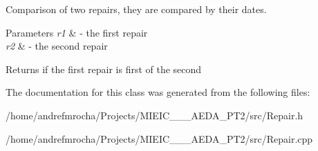 Comparison of two repairs, they are compared by their dates. 


\begin{DoxyParams}{Parameters}
{\em r1} & -\/ the first repair \\
\hline
{\em r2} & -\/ the second repair \\
\hline
\end{DoxyParams}
\begin{DoxyReturn}{Returns}
if the first repair is first of the second 
\end{DoxyReturn}


The documentation for this class was generated from the following files\+:\begin{DoxyCompactItemize}
\item 
/home/andrefmrocha/\+Projects/\+M\+I\+E\+I\+C\+\_\+\_\+\_\+\+A\+E\+D\+A\+\_\+\+P\+T2/src/Repair.\+h\item 
/home/andrefmrocha/\+Projects/\+M\+I\+E\+I\+C\+\_\+\_\+\_\+\+A\+E\+D\+A\+\_\+\+P\+T2/src/Repair.\+cpp\end{DoxyCompactItemize}
